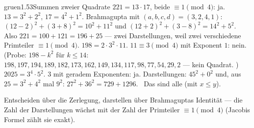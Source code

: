 \begin{loesungkarte}{gruen}{1.53}{Summen zweier Quadrate}
$221 = 13\cdot17$, beide $\equiv1\pmod4$: ja. $13 = 3^{2} + 2^{2}$, $17 = 4^{2} + 1^{2}$. Brahmagupta mit $(a, b, c, d) = (3, 2, 4, 1)$: $(12 - 2)^{2} + (3 + 8)^{2} = 10^{2} + 11^{2}$ und $(12 + 2)^{2} + (3 - 8)^{2} = 14^{2} + 5^{2}$. Also $221 = 100 + 121 = 196 + 25$ --- zwei Darstellungen, weil zwei verschiedene Primteiler $\equiv1\pmod4$.
$198 = 2\cdot3^{2}\cdot11$. $11\equiv3\pmod4$ mit Exponent $1$: nein. (Probe: $198 - k^{2}$ für $k\le14$: $198, 197, 194, 189, 182, 173, 162, 149, 134, 117, 98, 77, 54, 29, 2$ --- kein Quadrat. \checkmark)
$2025 = 3^{4}\cdot5^{2}$. $3$ mit geradem Exponenten: ja. Darstellungen: $45^{2} + 0^{2}$ und, aus $25 = 3^{2} + 4^{2}$ mal $9^{2}$: $27^{2} + 36^{2} = 729 + 1296$. \checkmark\ Das sind alle (mit $x\le y$).
\begin{mitnehmen}\kastentext
Entscheiden über die Zerlegung, darstellen über Brahmaguptas Identität --- die Zahl der Darstellungen wächst mit der Zahl der Primteiler $\equiv1\pmod4$ (Jacobis Formel zählt sie exakt).
\end{mitnehmen}
\end{loesungkarte}

